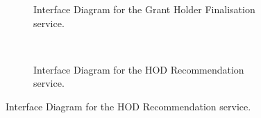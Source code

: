 \documentclass[12pt]{article}
\begin{document}
\begin{figure}[H]
\begin{subfigure}[p]{0.47\textwidth}
\centering	
{}
\caption{Interface Diagram for the Grant Holder Finalisation service.}
\end{subfigure}
~
\begin{subfigure}[p]{0.47\textwidth}
\centering	
{}
\caption{Interface Diagram for the HOD Recommendation service.}
\end{subfigure}


\end{figure}
\end{document}
